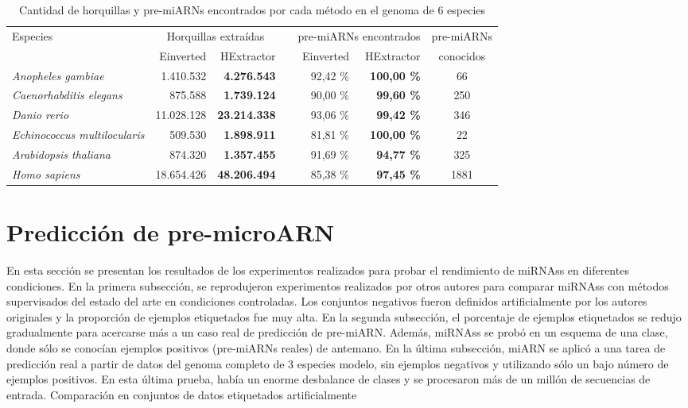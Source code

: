 \begin{table}[t]
	\centering
	\small
	\begin{tabular}{l r r r r r c}
		\toprule
		\multirow{2}{*}{Especies} & \multicolumn{2}{c}{Horquillas extraídas}  & & \multicolumn{2}{c}{pre-miARNs encontrados}    &    pre-miARNs  \\ \cmidrule{2-3} \cmidrule{5-6}
						    &    Einverted  &       HExtractor     & & Einverted     &   HExtractor  &  conocidos \\ \cmidrule{1-7}
		\textit{Anopheles gambiae}          &  1.410.532    &  \textbf{4.276.543}  & &  92,42 \%     &    \textbf{100,00  \%}       &   66        \\
		\textit{Caenorhabditis elegans}     &    875.588    &  \textbf{1.739.124}  & &  90,00 \%     &     \textbf{99,60  \%}       &  250        \\
		\textit{Danio rerio}                & 11.028.128    & \textbf{23.214.338}  & &  93,06 \%     &     \textbf{99,42  \%}       &  346        \\
		\textit{Echinococcus multilocularis}&    509.530    &  \textbf{1.898.911}  & &  81,81 \%     &    \textbf{100,00  \%}       &   22        \\
		\textit{Arabidopsis thaliana}       &    874.320    &  \textbf{1.357.455}  & &  91,69 \%     &     \textbf{94,77  \%}       &  325        \\
		\textit{Homo sapiens}               & 18.654.426    & \textbf{48.206.494}  & &  85,38 \%     &     \textbf{97,45  \%}       & 1881        \\
		\bottomrule
	\end{tabular}
	\label{tab:hextractor}
	\caption[Cantidad de horquillas y pre-miARN en varios genomas]{Cantidad de horquillas y pre-miARNs encontrados por cada método en el genoma de 6 especies}
\end{table}

\section{Predicción de pre-microARN}

En esta sección se presentan los resultados de los experimentos realizados para probar el rendimiento de miRNAss en diferentes condiciones. En la primera
subsección, se reprodujeron experimentos realizados por otros autores para comparar miRNAss con métodos supervisados del estado del arte en condiciones
controladas. Los conjuntos negativos fueron definidos artificialmente por los autores originales y la proporción de ejemplos etiquetados fue muy alta. En la
segunda subsección, el porcentaje de ejemplos etiquetados se redujo gradualmente para acercarse más a un caso real de predicción de pre-miARN. Además,
miRNAss se probó en un esquema de una clase, donde sólo se conocían ejemplos positivos (pre-miARNs reales) de antemano. En la última subsección, miARN se
aplicó a una tarea de predicción real a partir de datos del genoma completo de 3 especies modelo, sin ejemplos negativos y utilizando sólo un bajo número de
ejemplos positivos. En esta última prueba, había un enorme desbalance de clases y se procesaron más de un millón de secuencias de entrada.
Comparación en conjuntos de datos etiquetados artificialmente

